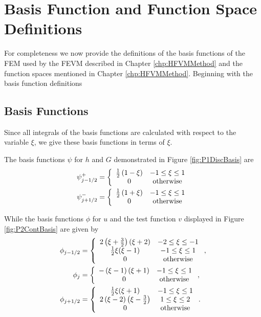 \chapter{Basis Function and Function Space Definitions}
\label{app:FEMIntegrals}
For completeness we now provide the definitions of the basis functions of the FEM used by the FEVM described in Chapter \ref{chp:HFVMMethod} and the function spaces mentioned in Chapter \ref{chp:HFVMMethod}. Beginning with the basis function definitions 

\section{Basis Functions}
Since all integrals of the basis functions are calculated with respect to the variable $\xi$, we give these basis functions in terms of $\xi$.

The basis functions $\psi$ for $h$ and $G$ demonstrated in Figure \ref{fig:P1DiscBasis} are
\begin{align}
\psi^+_{j-1/2} &= \left\lbrace \begin{array}{c c}
\frac{1}{2}\left(1 - \xi\right) & -1 \le \xi \le 1\\
0 & \text{otherwise}
\end{array} \right. \\
\psi^-_{j+1/2} &= \left\lbrace \begin{array}{c c}
\frac{1}{2}\left(1 + \xi\right) & -1 \le \xi \le 1\\
0 & \text{otherwise}
\end{array} \right. 
\end{align}

While the basis functions $\phi$ for $u$ and the test function $v$ displayed in Figure \ref{fig:P2ContBasis} are given by
\begin{align}
\phi_{j-1/2} &= \left\lbrace \begin{array}{c c}
2 \left(\xi + \frac{3}{2}\right)\left(\xi + 2\right) & -2 \le \xi \le -1\\
\frac{1}{2}\xi(\xi - 1) & -1 \le \xi \le 1\\
0 & \text{otherwise}\end{array} \right.  ,\\
\phi_{j} &= \left\lbrace \begin{array}{c c}
-\left(\xi - 1\right)\left(\xi + 1\right) & -1 \le \xi \le 1\\
0 & \text{otherwise}
\end{array} \right. , \\ 
\phi_{j+1/2} &= \left\lbrace \begin{array}{c c}
\frac{1}{2}\xi(\xi + 1) & -1 \le \xi \le 1\\
2\left(\xi - 2\right)\left(\xi - \frac{3}{2} \right) & 1 \le \xi \le 2\\
0 & \text{otherwise}
\end{array} \right. .\\ 
\end{align}

